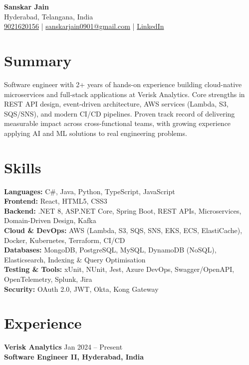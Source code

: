 \documentclass[letterpaper,10pt]{article}
\begin{document}
\begin{center}
    {\LARGE \textbf{Sanskar Jain}} \\
    Hyderabad, Telangana, India \\
    \href{tel:9021620156}{9021620156} \;|\;
    \href{mailto:sanskarjain0901@gmail.com}{sanskarjain0901@gmail.com} \;|\;
    \href{https://www.linkedin.com/in/sanskar-jain0901/}{LinkedIn}
\end{center}

\vspace{3pt}

\section*{Summary}
Software engineer with 2+ years of hands-on experience building cloud-native microservices and full-stack applications at Verisk Analytics.
Core strengths in REST API design, event-driven architecture, AWS services (Lambda, S3, SQS/SNS), and modern CI/CD pipelines.
Proven track record of delivering measurable impact across cross-functional teams, with growing experience applying AI and ML solutions to real engineering problems.

\section*{Skills}
\textbf{Languages:} C\#, Java, Python, TypeScript, JavaScript \\
\textbf{Frontend:} React, HTML5, CSS3 \\
\textbf{Backend:} .NET 8, ASP.NET Core, Spring Boot, REST APIs, Microservices, Domain-Driven Design, Kafka \\
\textbf{Cloud \& DevOps:} AWS (Lambda, S3, SQS, SNS, EKS, ECS, ElastiCache), Docker, Kubernetes, Terraform, CI/CD \\
\textbf{Databases:} MongoDB, PostgreSQL, MySQL, DynamoDB (NoSQL), Elasticsearch, Indexing \& Query Optimisation \\
\textbf{Testing \& Tools:} xUnit, NUnit, Jest, Azure DevOps, Swagger/OpenAPI, OpenTelemetry, Splunk, Jira \\
\textbf{Security:} OAuth 2.0, JWT, Okta, Kong Gateway

\section*{Experience}

\textbf{Verisk Analytics} \hfill Jan 2024 -- Present \\
\textbf{Software Engineer II, Hyderabad, India}
\end{document}

